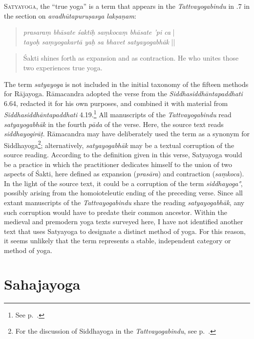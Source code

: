 \lettrine{S}{atyayoga}, the ``true yoga'' is a term that appears in the \emph{Tattvayogabindu} in .7 in the section on \textit{avadhūtapuruṣasya lakṣaṇam}:

\begin{quote}
  \textit{prasaraṃ bhāsate śaktiḥ saṃkocaṃ bhāsate 'pi ca} |\\
  \textit{tayoḥ saṃyogakartā yaḥ sa bhavet satyayogabhāk} ||
\end{quote}\begin{quote}
   Śakti shines forth as expansion and as contraction. He who unites those two experiences true yoga.
  \end{quote}

  The term \textit{satyayoga} is not included in the initial taxonomy of the fifteen methods for Rājayoga. Rāmacandra adopted the verse from the \emph{Siddhasiddhāntapaddhati} 6.64, redacted it for his own purposes, and combined it with material from \emph{Siddhasiddhāntapaddhati} 4.19.\footnote{See p.~\pageref{satyaavadhuta}.} All manuscripts of the \emph{Tattvayogabindu} read \textit{satyayogabhāk} in the fourth \textit{pāda} of the verse. Here, the source text reads \textit{siddhayogirāṭ}. Rāmacandra may have deliberately used the term as a synonym for Siddhayoga\footnote{For the discussion of Siddhayoga in the \textit{Tattvayogabindu}, see p.~\pageref{siddhayogaintro}.}; alternatively, \textit{satyayogabhāk} may be a textual corruption of the source reading. According to the definition given in this verse, Satyayoga would be a practice in which the practitioner dedicates himself to the union of two aspects of Śakti, here defined as expansion (\textit{prasāra}) and contraction (\textit{saṃkoca}). In the light of the source text, it could be a corruption of the term \textit{siddhayoga°}, possibly arising from the homoioteleutic ending of the preceding verse. Since all extant manuscripts of the \textit{Tattvayogabindu} share the reading \textit{satyayogabhāk}, any such corruption would have to predate their common ancestor. Within the medieval and premodern yoga texts surveyed here, I have not identified another text that uses Satyayoga to designate a distinct method of yoga. For this reason, it seems unlikely that the term represents a stable, independent category or method of yoga. 
  
\section{Sahajayoga}
\label{sahajayoga}

